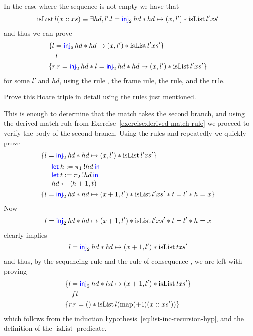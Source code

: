 \begin{example}
In the case where the sequence is not empty we have that
\begin{align*}
  \operatorname{isList} l (x::xs) \equiv \exists hd, l'. l = \textsf{\color{blue} inj}_{2}\nobreak\hskip 0.2em plus 0.1em hd * hd \mapsto (x,l') * \operatorname{isList} l' xs'
\end{align*}
and thus we can prove
\begin{align*}
  \hoareV
  { l = \Inj2 hd * hd \pointsto (x,l') * \operatorname{isList} l' xs'}
  {l}
  {r.r=\Inj2 hd * l = \Inj2 hd * hd \pointsto (x,l') * \operatorname{isList} l' xs'}
\end{align*}
for some $l'$ and $hd$, using the rule , the frame rule, the  rule, and the  rule.
\begin{exercise}
  \label{exercise:isList-second-case}
  Prove this Hoare triple in detail using the rules just mentioned.
\end{exercise}
This is enough to determine that the match takes the second branch, and using the derived match rule from Exercise~\ref{exercise:derived-match-rule} we proceed to verify the body of the second branch.
Using the rules  and  repeatedly we quickly prove 
\begin{align*}
  \hoareV{ l = \Inj2 hd * hd \pointsto (x,l') * \operatorname{isList} l' xs'}
  {\begin{array}{l}
     \Let h = \Proj1 !hd in\\
     \Let t = \Proj2 !hd in\\
     hd \gets (h + 1, t)
   \end{array}}
  {l = \Inj2 hd * hd \pointsto (x + 1,l') * \operatorname{isList} l' xs' * t = l' * h = x}
\end{align*}
Now
\begin{align*}
  l = \textsf{\color{blue} inj}_{2}\nobreak\hskip 0.2em plus 0.1em hd * hd \mapsto (x + 1,l') * \operatorname{isList} l' xs' * t = l' * h = x
\end{align*}
clearly implies
\begin{align*}
  l = \textsf{\color{blue} inj}_{2}\nobreak\hskip 0.2em plus 0.1em hd * hd \mapsto (x + 1,l') * \operatorname{isList} t xs'
\end{align*}
and thus, by the sequencing rule  and the rule of
consequence , we are left with proving
\begin{align*}
  \hoareV
  {l = \Inj2 hd * hd \pointsto (x + 1,l') * \operatorname{isList} t xs'}
  {f t}
  {r.r= () * \operatorname{isList} l (\operatorname{map} (+1) (x::xs'))}
\end{align*}
which follows from the induction hypothesis~\eqref{eq:list-inc-recursion-hyp}, and the definition of the $\operatorname{isList}$ predicate.
\end{example}

